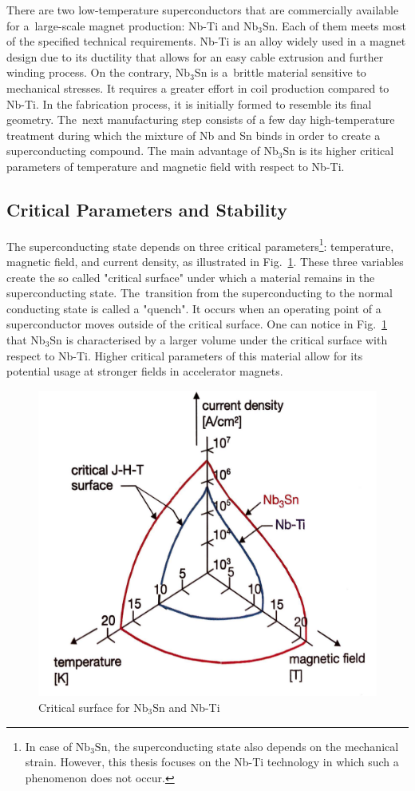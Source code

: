 There are two low-temperature superconductors that are commercially available for a~large-scale magnet production: Nb-Ti and $\text{Nb}_3 \text{Sn}$. Each of them meets most of the specified technical requirements. Nb-Ti is an alloy widely used in a magnet design due to its ductility that allows for an easy cable extrusion and further winding process. On the contrary, $\text{Nb}_3 \text{Sn}$ is a~brittle material sensitive to mechanical stresses. It requires a greater effort in coil production compared to Nb-Ti. In the fabrication process, it is initially formed to resemble its final geometry. The~next manufacturing step consists of a few day high-temperature treatment during which the mixture of Nb and Sn binds in order to create a superconducting compound. The main advantage of $\text{Nb}_3 \text{Sn}$ is its higher critical parameters of temperature and magnetic field with respect to Nb-Ti.~\cite[p.~29-41]{superconducting_accelerator_magnets}

\subsection{Critical Parameters and Stability}

The superconducting state depends on three critical parameters\footnote{In case of $\text{Nb}_3 \text{Sn}$, the superconducting state also depends on the mechanical strain. However, this thesis focuses on the Nb-Ti technology in which such a phenomenon does not occur.}: temperature, magnetic field, and current density, as illustrated in Fig.~\ref{fig:scheme_critical_surface}. These three variables create the so called "critical surface" under which a material remains in the superconducting state. The~transition from the superconducting to the normal conducting state is called a "quench". It occurs when an operating point of a superconductor moves outside of the critical surface. One can notice in Fig.~\ref{fig:scheme_critical_surface} that $\text{Nb}_3 \text{Sn}$ is characterised by a larger volume under the critical surface with respect to Nb-Ti. Higher critical parameters of this material allow for its potential usage at stronger fields in accelerator magnets.

\begin{figure}[H]
    \centering
    \includegraphics[width=0.35\linewidth]{sections/introduction/figures/critical_surface_scheme.png}
    \caption{Critical surface for $\text{Nb}_\text{3}\text{Sn}$ and Nb-Ti \cite{evans_marvel_of_technology}}
    \label{fig:scheme_critical_surface}
\end{figure} 

